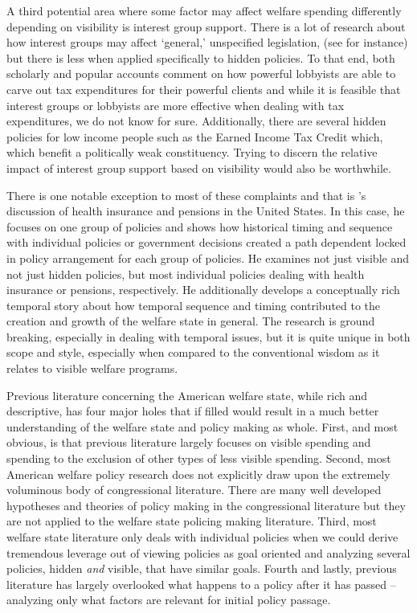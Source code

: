 \documentclass[12pt]{article}
\begin{document}
A third potential area where some factor may affect welfare spending differently depending on visibility is interest group support. There is a lot of research about how interest groups may affect `general,' unspecified legislation, (see \citealt{hall2006} for instance) but there is less when applied specifically to hidden policies. To that end, both scholarly and popular accounts comment on how powerful lobbyists are able to carve out tax expenditures for their  powerful clients \citep{hacker2011, leibovich2013} and while it is feasible that interest groups or lobbyists are more effective when dealing with tax expenditures, we do not know for sure. Additionally, there are several hidden policies for low income people such as the Earned Income Tax Credit which, which benefit a politically weak constituency. Trying to discern the relative impact of interest group support based on visibility would also be worthwhile.

There is one notable exception to most of these complaints and that is \citet{hacker2002}'s discussion of health insurance and pensions in the United States. In this case, he focuses on one group of policies and shows how historical timing and sequence with individual policies or government decisions created a path dependent locked in policy arrangement for each group of policies. He examines not just visible and not just hidden policies, but most individual policies dealing with health insurance or pensions, respectively. He additionally develops a conceptually rich temporal story about how temporal sequence and timing contributed to the creation and growth of the welfare state in general. The \cite{hacker2002} research is ground breaking, especially in dealing with temporal issues, but it is quite unique in both scope and style, especially when compared to the conventional wisdom as it relates to visible welfare programs.

Previous literature concerning the American welfare state, while rich and descriptive, has four major holes that if filled would result in a much better understanding of the welfare state and policy making as whole. First, and most obvious, is that previous literature largely focuses on visible spending and spending to the exclusion of other types of less visible spending. Second, most American welfare policy research does not explicitly draw upon the extremely voluminous body of congressional literature. There are many well developed hypotheses and theories of policy making in the congressional literature but they are not applied to the welfare state policing making literature. Third, most welfare state literature only deals with individual policies when we could derive tremendous leverage out of viewing policies as goal oriented and analyzing several policies, hidden \emph{and} visible, that have similar goals. Fourth and lastly, previous literature has largely overlooked what happens to a policy after it has passed -- analyzing only what factors are relevant for initial policy passage.
\end{document}

